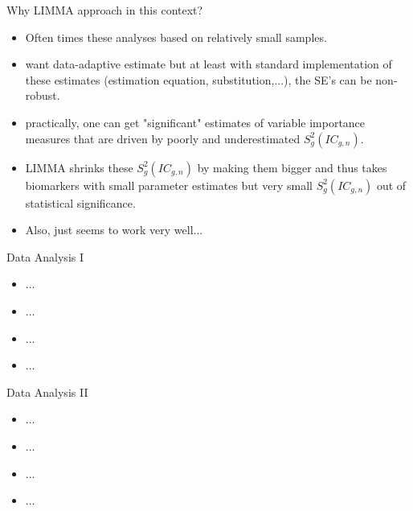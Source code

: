 \documentclass[12pt,t,handout]{beamer}
\begin{document}
\begin{frame}[c]{Why LIMMA approach in this context?}

\begin{center}
\begin{itemize}
\item Often times these analyses based on relatively small samples.
\item want data-adaptive estimate but at least with standard implementation of these estimates (estimation equation, substitution,...), the SE's can be non-robust.
\item practically, one can get "significant" estimates of variable importance measures that are driven by poorly and underestimated $S^2_g(IC_{g,n})$. 
\item LIMMA shrinks these $S^2_g(IC_{g,n})$ by making them bigger and thus takes biomarkers with small parameter estimates but very small $S^2_g(IC_{g,n})$ out of statistical significance.
\item Also, just seems to work very well...
\end{itemize}
\end{center}


\end{frame}



\begin{frame}[c]{Data Analysis I}

\begin{center}
\begin{itemize}
  \itemsep12pt
  \item $\dots$
  \item $\dots$
  \item $\dots$
  \item $\dots$
\end{itemize}
\end{center}


\end{frame}



\begin{frame}[c]{Data Analysis II}

\begin{center}
\begin{itemize}
  \itemsep12pt
  \item $\dots$
  \item $\dots$
  \item $\dots$
  \item $\dots$
\end{itemize}
\end{center}


\end{frame}
\end{document}
